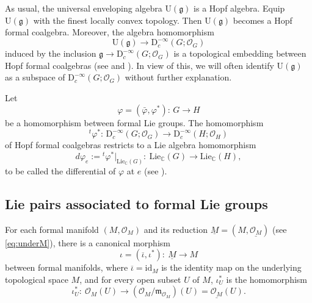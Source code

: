 \documentclass[12pt, a4paper]{amsart}
\newcommand{\BC}{{\mathbb {C}}}
\newcommand{\CO}{{\mathcal {O}}}
\newcommand{\RD}{{\mathrm {D}}}
\newcommand{\RU}{{\mathrm {U}}}
\newcommand{\Lie}{{\mathrm{Lie}}}
\newcommand{\wh}{\widehat}
\newcommand{\g}{\mathfrak g}
\newcommand{\m}{\mathfrak m}
\newcommand{\C}{\mathbb{C}}
\newcommand{\be}{\begin {equation}}
\newcommand{\ee}{\end {equation}}
\theoremstyle{Theorem}
\theoremstyle{Theorem}
\theoremstyle{Theorem}
\theoremstyle{Theorem}
\theoremstyle{Plain}
\theoremstyle{remark}
\theoremstyle{remark}
\theoremstyle{Definition}
\newtheorem{lemd}[dfn]{Lemma}
\numberwithin{equation}{section}
\begin{document}
As usual, the universal enveloping algebra $\RU(\g)$ is a Hopf algebra. Equip $\RU(\g)$ with the finest locally convex topology.  Then $\RU(\g)$ becomes a Hopf formal coalgebra.
Moreover, the algebra homomorphism \be \label{eq:Utodist}\RU(\g)\rightarrow \RD^{-\infty}_c(G;\CO_G) \ee induced by the inclusion $\g\rightarrow \RD^{-\infty}_c(G;\CO_G)$
      is a topological embedding between Hopf formal coalgebras (see \cite[Proposition 2.8]{CSW4} and \cite[Section 5.3]{CSW2}).
In view of this, we will often identify $\RU(\g)$ as a subspace of $\RD^{-\infty}_c(G;\CO_G)$ 
without further explanation.

Let
\[
\varphi=(\bar\varphi,\varphi^*):\, G\rightarrow H
\] be a homomorphism between formal Lie groups. 
The homomorphism 
\[
{}^t\varphi^*:\, \RD_c^{-\infty}(G;\CO_{G})\rightarrow \RD_c^{-\infty}(H;\CO_{H})
\]
of Hopf formal coalgebras restricts to a Lie algebra homomorphism
\[
d\varphi_e:={}^t\varphi^*|_{\mathrm{Lie}_\C(G)}:\ \mathrm{Lie}_\C(G)
\rightarrow \mathrm{Lie}_\C(H), 
\] 
to be called the differential of $\varphi$ at $e$ (see \cite[Proposition 2.8]{CSW4}).



\subsection{Lie pairs associated to formal Lie groups}
For each formal manifold $(M,\CO_M)$ and its reduction $\underline{M}=(M,\underline{\CO_M})$ (see \eqref{eq:underM}), there is a canonical morphism 
\[\iota=(\overline{\iota},\iota^*): \ \underline M\rightarrow M\]
between formal manifolds, where $\overline{\iota}=\mathrm{id}_M$ is the identity map on the underlying topological space $M$, and for every open subset $U$ of $M$, $\iota^*_{U}$ is the homomorphism  \be \label{eq:iotaU}\iota^*_{U}:\ \CO_M(U)\rightarrow (\CO_M/\m_{\CO_M})(U)=\underline{\CO_M}(U).\ee 
\end{document}
